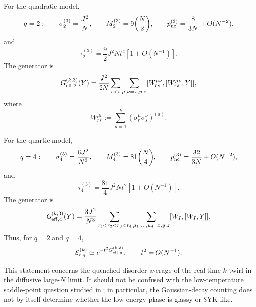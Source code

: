 \documentclass{article}
\theoremstyle{definition}
\begin{document}
For the quadratic model,
\begin{equation}
    q=2:
    \qquad
    \sigma_2^{(3)}=\frac{J^2}{N},
    \qquad
    M_2^{(3)}=9\binom N2,
    \qquad
    p_{\rm nc}^{(3)}
    =
    \frac{8}{3N}+O(N^{-2}),
    \label{eq:SW_q2_data}
\end{equation}
and
\begin{equation}
    \tau_2^{(3)}
    =
    \frac92J^2Nt^2
    \left[
       1+O(N^{-1})
    \right].
    \label{eq:SW_q2_tau}
\end{equation}
The generator is
\begin{equation}
    G_{{\rm eff},2}^{(k,3)}(Y)
    =
    \frac{J^2}{2N}
    \sum_{r<s}
    \sum_{\mu,\nu=x,y,z}
    [W_{rs}^{\mu\nu},
     [W_{rs}^{\mu\nu},Y]],
    \label{eq:SW_q2_Geff}
\end{equation}
where
\begin{equation}
    W_{rs}^{\mu\nu}
    :=
    \sum_{a=1}^k
    (\sigma_r^\mu\sigma_s^\nu)^{(a)}.
\end{equation}

For the quartic model,
\begin{equation}
    q=4:
    \qquad
    \sigma_4^{(3)}
    =
    \frac{6J^2}{N^3},
    \qquad
    M_4^{(3)}
    =
    81\binom N4,
    \qquad
    p_{\rm nc}^{(3)}
    =
    \frac{32}{3N}
    +
    O(N^{-2}),
    \label{eq:SW_q4_data}
\end{equation}
and
\begin{equation}
    \tau_4^{(3)}
    =
    \frac{81}{4}J^2Nt^2
    \left[
       1+O(N^{-1})
    \right].
    \label{eq:SW_q4_tau}
\end{equation}
The generator is
\begin{equation}
    G_{{\rm eff},4}^{(k,3)}(Y)
    =
    \frac{3J^2}{N^3}
    \sum_{r_1<r_2<r_3<r_4}
    \sum_{\mu_1,\ldots,\mu_4=x,y,z}
    [W_I,[W_I,Y]].
    \label{eq:SW_q4_Geff}
\end{equation}
Thus, for $q=2$ and $q=4$,
\begin{equation}
    {\cal E}_{t,q}^{(k)}
    \simeq
    e^{-t^2G_{{\rm eff},q}^{(k,3)}},
    \qquad
    t^2=O(N^{-1}).
    \label{eq:SW_final_regulator}
\end{equation}

This statement concerns the quenched disorder average of the real-time
$k$-twirl in the diffusive large-$N$ limit.  It should not be confused
with the low-temperature saddle-point question studied in
\cite{SwingleWiner}; in particular, the Gaussian-decay counting does not
by itself determine whether the low-energy phase is glassy or SYK-like.
\end{document}

